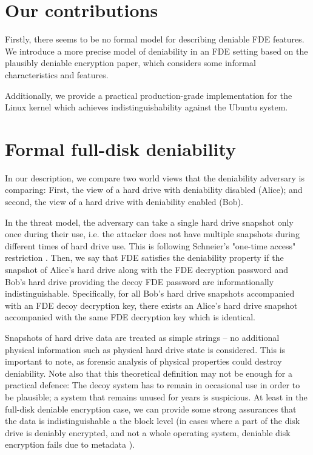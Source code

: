 \documentclass{acm_proc_article-sp}
\begin{document}
\section{Our contributions}

Firstly, there seems to be no formal model for describing deniable FDE
features. We introduce a more precise model of deniability in an FDE setting
based on the plausibly deniable encryption paper, which considers some informal
characteristics and features.

Additionally, we provide a practical production-grade implementation for the
Linux kernel which achieves indistinguishability against the Ubuntu system.

\section{Formal full-disk deniability}

In our description, we compare two world views that the deniability adversary
is comparing: First, the view of a hard drive with deniability disabled
(Alice); and second, the view of a hard drive with deniability enabled (Bob).

In the threat model, the adversary can take a single hard drive snapshot only
once during their use, i.e. the attacker does not have multiple snapshots
during different times of hard drive use. This is following Schneier's
"one-time access" restriction \cite{c4}. Then, we say that FDE satisfies the
deniability property if the snapshot of Alice's hard drive along with the FDE
decryption password and Bob's hard drive providing the decoy FDE password are
informationally indistinguishable. Specifically, for all Bob's hard drive
snapshots accompanied with an FDE decoy decryption key, there exists an Alice's
hard drive snapshot accompanied with the same FDE decryption key which is
identical.

Snapshots of hard drive data are treated as simple strings – no additional
physical information such as physical hard drive state is considered. This is
important to note, as forensic analysis of physical properties could destroy
deniability. Note also that this theoretical definition may not be enough for a
practical defence: The decoy system has to remain in occasional use in order to
be plausible; a system that remains unused for years is suspicious. At least in
the full-disk deniable encryption case, we can provide some strong assurances
that the data is indistinguishable a the block level (in cases where a part of
the disk drive is deniably encrypted, and not a whole operating system,
deniable disk encryption fails due to metadata \cite{c3}).
\end{document}
